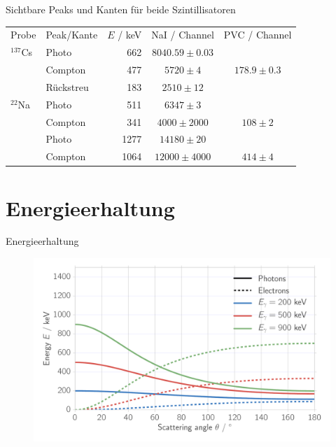 \documentclass[xcolor=x11names,compress]{beamer}
\renewcommand{\(}{\begin{columns}}
\renewcommand{\)}{\end{columns}}
\newcommand{\<}[1]{\begin{column}{#1}}
\renewcommand{\>}{\end{column}}
\begin{document}
\begin{frame}[t]{Sichtbare Peaks und Kanten für beide Szintillisatoren}
\begin{table}[htpb]
    \centering
    \label{tab:mono_calibration}
    \begin{tabular}{l l r c c}
        \rowcolor{LightCyan} Probe & Peak/Kante & $E$ / keV& NaI / Channel & PVC / Channel \\
        \cellcolor{LightCyan}$^{137}$Cs & Photo & 662 & $8040.59 \pm 0.03$ &  \\
        \cellcolor{LightCyan} & Compton& 477& $5720 \pm 4$ &  $178.9 \pm 0.3$  \\
        \cellcolor{LightCyan} & Rückstreu& 183&  $2510 \pm 12$ &  \\
        \cellcolor{LightCyan}$^{22}$Na & Photo& 511& $6347 \pm 3$&  \\
        \cellcolor{LightCyan} & Compton& 341& $4000 \pm 2000$& $108 \pm 2$  \\
        \cellcolor{LightCyan} & Photo& 1277& $14180 \pm 20 $& \\
        \cellcolor{LightCyan} & Compton& 1064& $12000 \pm 4000$& $414 \pm 4$ \\
    \end{tabular}
\end{table}
\end{frame}


\section{Energieerhaltung}
\begin{frame}[t]{Energieerhaltung}
\begin{figure}[htpb]
    \centering
    \includegraphics[width=1.0\linewidth]{../analysis/figures/theory_conservation}
\label{fig:theory_cons}
\end{figure}
\end{frame}
\end{document}
